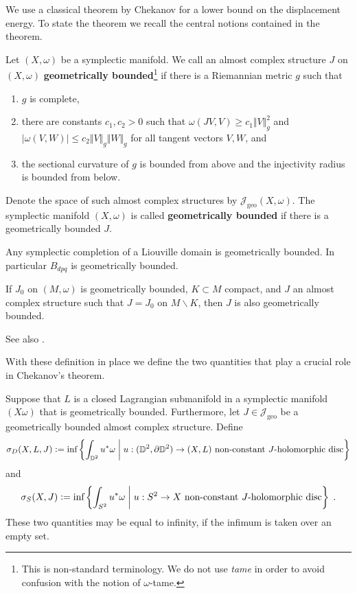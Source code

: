 \documentclass[12pt,a4paper,draft]{scrartcl}
\begin{document}
We use a classical theorem by Chekanov \cite{chekanov1998} for a lower bound on the displacement energy. To state the theorem we recall the central notions contained in the theorem.

\begin{definition}
    Let $(X,\omega)$ be a symplectic manifold. We call an almost complex structure $J$ on $(X,\omega)$ \textbf{geometrically bounded}\footnote{This is non-standard terminology. We do not use \textit{tame} in order to avoid confusion with the notion of $\omega$-tame.} if there is a Riemannian metric $g$ such that 
    \begin{enumerate}
        \item $g$ is complete,
        \item there are constants $c_1,c_2 > 0$ such that $\omega(JV,V) \geqslant c_1 \Vert V \Vert_g^2$ and $\vert \omega(V,W) \vert \leqslant c_2 \Vert V \Vert_g \Vert W \Vert_g$ for all tangent vectors $V,W$, and
        \item the sectional curvature of $g$ is bounded from above and the injectivity radius is bounded from below.
    \end{enumerate}
    Denote the space of such almost complex structures by $\mathcal{J}_{\text{geo}}(X,\omega)$.
    The symplectic manifold $(X,\omega)$ is called \textbf{geometrically bounded} if there is a geometrically bounded $J$. 
\end{definition}

\begin{remark}
  \label{rem:Bdpq_geometrically_bounded}
  Any symplectic completion of a Liouville domain is geometrically bounded. In particular $B_{dpq}$ is geometrically bounded.
\end{remark}
\begin{remark}
  \label{rem:J_compactly_perturbed}
  If $J_0$ on $(M,ω)$ is geometrically bounded, $K ⊂ M$ compact, and $J$ an almost complex structure such that $J = J_0$ on $M ∖ K$, then $J$ is also geometrically bounded.
\end{remark}

See also \cite[Chapter X, Definition 2.2.1]{AudLaf94}.

With these definition in place we define the two quantities that play a crucial role in Chekanov's theorem.

\begin{definition}
    Suppose that $L$ is a closed Lagrangian submanifold in a symplectic manifold $(X\omega)$ that is geometrically bounded. Furthermore, let $J \in \mathcal{J}_{\text{geo}}$ be a geometrically bounded almost complex structure. Define
    \[
        \sigma_D(X,L,J)\vcentcolon=\text{inf}\left\{\int_{\mathbb{D}^2} u^*\omega \;\middle|\; u:(\mathbb{D}^2,\partial {\mathbb{D}^2}) \to (X,L) \text{ non-constant $J$-holomorphic disc}   \right\}
    \]
    and 
    \[
        \sigma_S(X,J)\vcentcolon=\text{inf}\left\{\int_{S^2} u^*\omega \;\middle|\; u:S^2 \to X \text{ non-constant $J$-holomorphic disc}   \right\} \; .
    \]
    These two quantities may be equal to infinity, if the infimum is taken over an empty set.
\end{definition}
\end{document}
